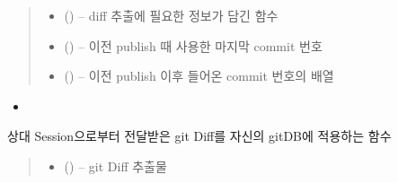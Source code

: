 \documentclass[a4paper,10pt,english]{sphinxmanual}
\begin{document}
\begin{fulllineitems}
\begin{fulllineitems}
\begin{quote}
\begin{description}
\begin{itemize}
\item {} 
\sphinxAtStartPar
{} () – diff 추출에 필요한 정보가 담긴 함수

\item {} 
\sphinxAtStartPar
{} () – 이전 publish 때 사용한 마지막 commit 번호

\item {} 
\sphinxAtStartPar
{} () – 이전 publish 이후 들어온 commit 번호의 배열

\end{itemize}

\end{description}\end{quote}


\nopagebreak

\begin{itemize}
\item {} 
\sphinxAtStartPar
{\hyperref[\detokenize{_Session:Session.Publish}]{}}

\end{itemize}



\end{fulllineitems}


\begin{fulllineitems}
\label{\detokenize{_Session:Session.gitPatch}}
\pysigstartsignatures
{}
\pysigstopsignatures
\sphinxAtStartPar
상대 Session으로부터 전달받은 git Diff를 자신의 gitDB에 적용하는 함수
\begin{quote}\begin{description}
\begin{itemize}
\item {} 
\sphinxAtStartPar
{} () – git Diff 추출물


\end{itemize}
\end{description}
\end{quote}
\end{fulllineitems}
\end{fulllineitems}
\end{document}
